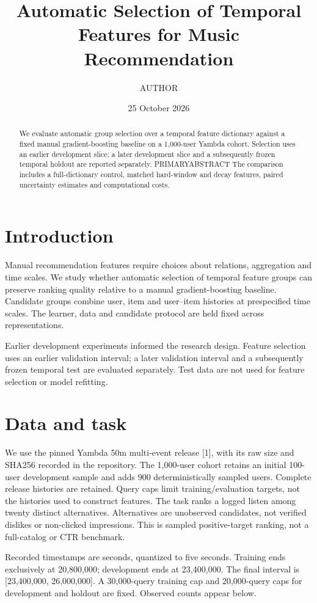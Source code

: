 \documentclass[10pt,a4paper]{article}
\title{Automatic Selection of Temporal Features for Music Recommendation}
\author{AUTHOR}\date{25 October 2026}
\begin{document}
\maketitle


\begin{abstract}
We evaluate automatic group selection over a temporal feature dictionary
against a fixed manual gradient-boosting baseline on a 1,000-user Yambda cohort.
Selection uses an earlier development slice; a later development slice and
a subsequently frozen temporal holdout are reported separately.
PRIMARYABSTRACT
The comparison includes a full-dictionary control, matched hard-window and
decay features, paired uncertainty estimates and computational costs.
\end{abstract}
\section{Introduction}
Manual recommendation features require choices about relations, aggregation
and time scales. We study whether automatic selection of temporal feature
groups can preserve ranking quality relative to a manual gradient-boosting
baseline. Candidate groups combine user, item and user--item histories at
prespecified time scales. The learner, data and candidate protocol are held
fixed across representations.

Earlier development experiments informed the research design. Feature selection
uses an earlier validation interval; a later validation interval and a
subsequently frozen temporal test are evaluated separately. Test data are not
used for feature selection or model refitting.

\section{Data and task}
We use the pinned Yambda 50m multi-event release [1], with its raw size and
SHA256 recorded in the repository. The 1,000-user cohort retains an initial 100-user development sample and
adds 900 deterministically sampled users. Complete release histories are retained. Query caps limit
training/evaluation targets, not the histories used to construct features.
The task ranks a logged listen among twenty distinct alternatives. Alternatives
are unobserved candidates, not verified dislikes or non-clicked impressions.
This is sampled positive-target ranking, not a full-catalog or CTR benchmark.

Recorded timestamps are seconds, quantized to five seconds. Training ends
exclusively at 20,800,000; development ends at 23,400,000. The final interval
is [23,400,000, 26,000,000]. A 30,000-query training cap and 20,000-query caps
for development and holdout are fixed. Observed counts appear below.
\clearpage
\end{document}
